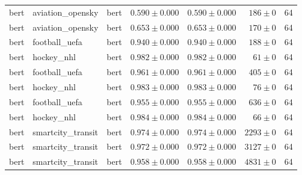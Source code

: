 \begin{table}[htbp]
\begin{tabular}{l l l r r r r}
bert & aviation\_opensky & bert & $0.590\pm0.000$ & $0.590\pm0.000$ & $186\pm0$ & 64 \\
bert & aviation\_opensky & bert & $0.653\pm0.000$ & $0.653\pm0.000$ & $170\pm0$ & 64 \\
bert & football\_uefa & bert & $0.940\pm0.000$ & $0.940\pm0.000$ & $188\pm0$ & 64 \\
bert & hockey\_nhl & bert & $0.982\pm0.000$ & $0.982\pm0.000$ & $61\pm0$ & 64 \\
bert & football\_uefa & bert & $0.961\pm0.000$ & $0.961\pm0.000$ & $405\pm0$ & 64 \\
bert & hockey\_nhl & bert & $0.983\pm0.000$ & $0.983\pm0.000$ & $76\pm0$ & 64 \\
bert & football\_uefa & bert & $0.955\pm0.000$ & $0.955\pm0.000$ & $636\pm0$ & 64 \\
bert & hockey\_nhl & bert & $0.984\pm0.000$ & $0.984\pm0.000$ & $66\pm0$ & 64 \\
bert & smartcity\_transit & bert & $0.974\pm0.000$ & $0.974\pm0.000$ & $2293\pm0$ & 64 \\
bert & smartcity\_transit & bert & $0.972\pm0.000$ & $0.972\pm0.000$ & $3127\pm0$ & 64 \\
bert & smartcity\_transit & bert & $0.958\pm0.000$ & $0.958\pm0.000$ & $4831\pm0$ & 64 \\
\hline
\end{tabular}
\end{table}
